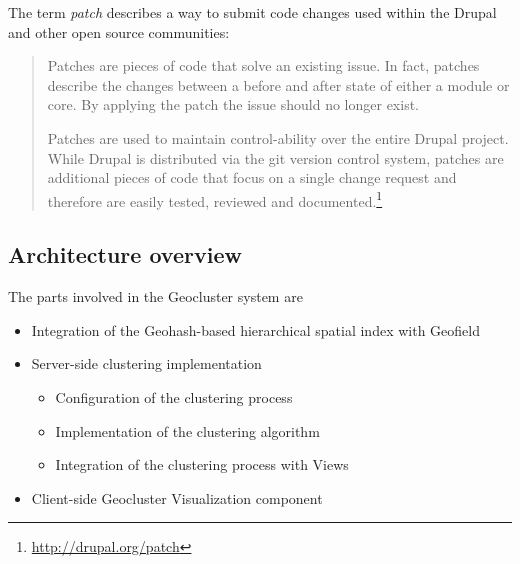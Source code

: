 The term \textit{patch} describes a way to submit code changes used within the Drupal and other open source communities:

\begin{quote}
Patches are pieces of code that solve an existing issue. In fact, patches describe the changes between a before and after state of either a module or core. By applying the patch the issue should no longer exist.

Patches are used to maintain control-ability over the entire Drupal project. While Drupal is distributed via the git version control system, patches are additional pieces of code that focus on a single change request and therefore are easily tested, reviewed and documented.\footnote{\url{http://drupal.org/patch}}
\end{quote}



\subsection{Architecture overview}

The parts involved in the Geocluster system are

\begin{itemize}

\item Integration of the Geohash-based hierarchical spatial index with Geofield

\item Server-side clustering implementation
  \begin{itemize}
   \item Configuration of the clustering process
   \item Implementation of the clustering algorithm
   \item Integration of the clustering process with Views
  \end{itemize}

\item Client-side Geocluster Visualization component

\end{itemize}


